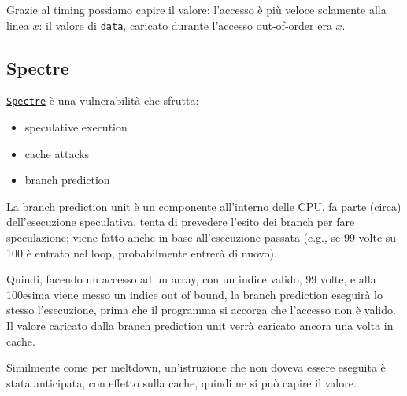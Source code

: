 Grazie al timing possiamo capire il valore: l'accesso è più veloce solamente alla linea $x$: il valore di \texttt{data}, caricato durante l'accesso out-of-order era $x$.

\subsection{Spectre}

\href{https://spectreattack.com/spectre.pdf}{\texttt{Spectre}} è una vulnerabilità che sfrutta:
\begin{itemize}
	\item speculative execution
	\item cache attacks
	\item branch prediction
\end{itemize}

La branch prediction unit è un componente all'interno delle CPU, fa parte (circa) dell'esecuzione speculativa, tenta di prevedere l'esito dei branch per fare speculazione; viene fatto anche in base all'esecuzione passata (e.g., se 99 volte su 100 è entrato nel loop, probabilmente entrerà di nuovo).

Quindi, facendo un accesso ad un array, con un indice valido, 99 volte, e alla 100esima viene messo un indice out of bound, la branch prediction eseguirà lo stesso l'esecuzione, prima che il programma si accorga che l'accesso non è valido. Il valore caricato dalla branch prediction unit verrà caricato ancora una volta in cache.

Similmente come per meltdown, un'istruzione che non doveva essere eseguita è stata anticipata, con effetto sulla cache, quindi ne si può capire il valore. 

